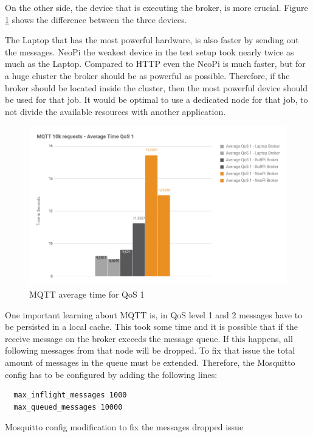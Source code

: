 On the other side, the device that is executing the broker, is more crucial.
Figure \ref{fig:performance_mqtt_average_time_qos_1} shows the difference between the three devices.\newline

The Laptop that has the most powerful hardware, is also faster by sending out the messages.
NeoPi the weakest device in the test setup took nearly twice as much as the Laptop.
Compared to \ac{HTTP} even the NeoPi is much faster, but for a huge cluster the broker should be as powerful as possible.
Therefore, if the broker should be located inside the cluster, then the most powerful device should be used for that job.
It would be optimal to use a dedicated node for that job, to not divide the available resources with another application.

\begin{figure}[H]
    \centering
    \includegraphics[width=\textwidth]{resources/images/performance_mqtt_average_time_qos_1.png}
    \caption[MQTT average time for QoS 1]{MQTT average time for QoS 1}
    \label{fig:performance_mqtt_average_time_qos_1}
\end{figure}

One important learning about MQTT is, in \ac{QoS} level 1 and 2 messages have to be persisted in a local cache.
This took some time and it is possible that if the receive message on the broker exceeds the message queue.
If this happens, all following messages from that node will be dropped.
To fix that issue the total amount of messages in the queue must be extended.
Therefore, the Mosquitto config has to be configured by adding the following lines:

\begin{listing}[H]
  \begin{verbatim}
  max_inflight_messages 1000
  max_queued_messages 10000
  \end{verbatim}
  \caption[Mosquitto config modification to fix the messages dropped issue]{Mosquitto config modification to fix the messages dropped issue}
  \label{code:performance_mosquitto_config}
\end{listing}

